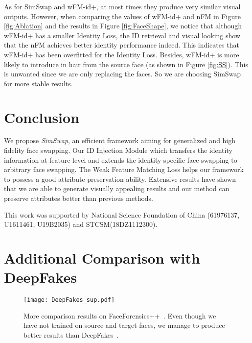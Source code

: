\documentclass[sigconf]{acmart}
\begin{document}
As for SimSwap and wFM-id+, at most times they produce very similar visual outputs. However, when comparing the values of wFM-id+ and nFM in Figure \ref{fig:Ablation} and the results in Figure \ref{fig:FaceShape}, we notice that although wFM-id+ has a smaller Identity Loss, the ID retrieval and visual looking show that the nFM achieves better identity performance indeed. This indicates that wFM-id+ has been overfitted for the Identity Loss. Besides, wFM-id+ is more likely to introduce in hair from the source face (as shown in Figure \ref{fig:SS}). This is unwanted since we are only replacing the faces. So we are choosing SimSwap for more stable results.




\section{Conclusion}

We propose \emph{SimSwap}, an efficient framework aiming for generalized and high fidelity face swapping. Our ID Injection Module which transfers the identity information at feature level and extends the identity-specific face swapping to arbitrary face swapping. The Weak Feature Matching Loss helps our framework to possess a good attribute preservation ability. Extensive results have shown that we are able to generate visually appealing results and our method can preserve attributes better than previous methods.


\begin{acks}
This work was supported by National Science Foundation of China (61976137, U1611461, U19B2035) and STCSM(18DZ1112300).
\end{acks}




\appendix


\section{Additional Comparison with DeepFakes}

\begin{figure*}[!ht]
  \centering
  \texttt{[image: DeepFakes\_sup.pdf]}
  \caption{More comparison results on FaceForensics++~\cite{DBLP:faceforensics}. Even though we have not trained on source and target faces, we manage to produce better results than DeepFakes~\cite{DeepFakes}.}
  \label{fig:deepfakes_more}
\end{figure*}
\end{document}
